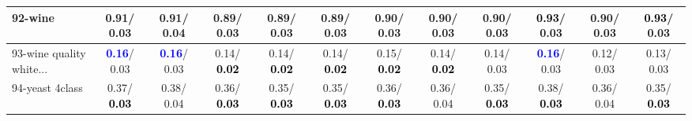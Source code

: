 \begin{table}[h]
\begin{center}
{\begin{tabular}{lc|c|c|c|c|c|c|c|c|c|c}
92-wine &   0.91/  0.03 &   0.91/  0.04 &   0.89/  0.03 &   0.89/  0.03 &   0.89/  0.03 &   0.90/  0.03 &   0.90/  0.03 &   0.90/  0.03 & \textcolor{black}{\textbf{  0.93}}/  0.03 &   0.90/  0.03 & \textcolor{black}{\textbf{  0.93}}/  0.03 \\ \hline
93-wine quality white... & \textcolor{blue}{\textbf{  0.16}}/  0.03 & \textcolor{blue}{\textbf{  0.16}}/  0.03 &   0.14/\textcolor{black}{\textbf{  0.02}} &   0.14/\textcolor{black}{\textbf{  0.02}} &   0.14/\textcolor{black}{\textbf{  0.02}} &   0.15/\textcolor{black}{\textbf{  0.02}} &   0.14/\textcolor{black}{\textbf{  0.02}} &   0.14/  0.03 & \textcolor{blue}{\textbf{  0.16}}/  0.03 &   0.12/  0.03 &   0.13/  0.03 \\
94-yeast 4class &   0.37/\textcolor{black}{\textbf{  0.03}} &   0.38/  0.04 &   0.36/\textcolor{black}{\textbf{  0.03}} &   0.35/\textcolor{black}{\textbf{  0.03}} &   0.35/\textcolor{black}{\textbf{  0.03}} &   0.36/\textcolor{black}{\textbf{  0.03}} &   0.36/  0.04 &   0.35/\textcolor{black}{\textbf{  0.03}} &   0.38/\textcolor{black}{\textbf{  0.03}} &   0.36/  0.04 &   0.35/\textcolor{black}{\textbf{  0.03}} \\\end{tabular}
}\label{strats2aRFw}
\end{center}
\end{table}
